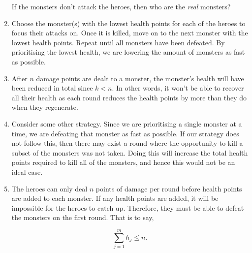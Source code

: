 \documentclass{article}
\begin{document}
\begin{solution}
\begin{enumerate}[label=(\alph*)]
If the monsters don't attack the heroes, then who are the \emph{real} monsters?

\item Choose the monster(s) with the lowest health points for each of the heroes to focus their attacks on. Once it is killed, move on to the next monster with the lowest health points. Repeat until all monsters have been defeated. By prioritising the lowest health, we are lowering the amount of monsters as fast as possible.

\item After $n$ damage points are dealt to a monster, the monster's health will have been reduced in total since $k < n$. In other words, it won't be able to recover all their health as each round reduces the health points by more than they do when they regenerate.

\item Consider some other strategy. Since we are prioritising a single monster at a time, we are defeating that monster as fast as possible. If our strategy does not follow this, then there may exist a round where the opportunity to kill a subset of the monsters was not taken. Doing this will increase the total health points required to kill all of the monsters, and hence this would not be an ideal case.

\item  The heroes can only deal $n$ points of damage per round before health points are added to each monster. If any health points are added, it will be impossible for the heroes to catch up. Therefore, they must be able to defeat the monsters on the first round. That is to say,

$$\sum_{j=1}^m h_j \leq n.$$
\end{enumerate}
\end{solution}
\end{document}
